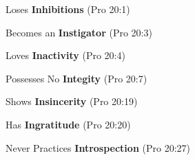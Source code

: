 \begin{compactenum}[I.][8]
    \item Loses \textbf{Inhibitions}  (Pro 20:1)
    \item Becomes an \textbf{Instigator}  (Pro 20:3)
    \item Loves \textbf{Inactivity}  (Pro 20:4)
    \item Possesses No \textbf{Integity}  (Pro 20:7)
    \item Shows \textbf{Insincerity}  (Pro 20:19)
    \item Has \textbf{Ingratitude}  (Pro 20:20)
    \item Never Practices \textbf{Introspection}  (Pro 20:27)
\end{compactenum}
